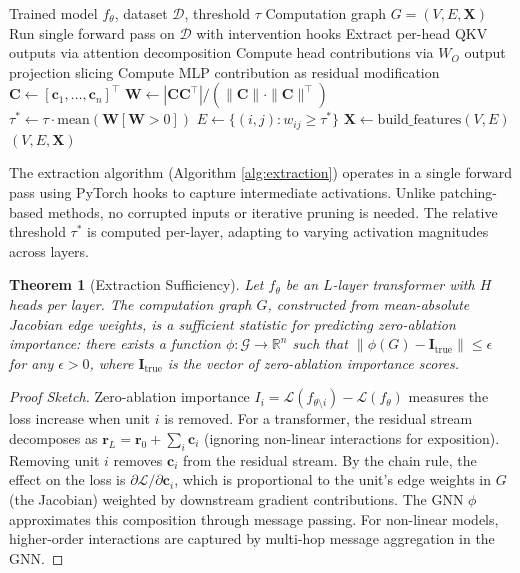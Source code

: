 \documentclass[11pt,a4paper]{article}
\newtheorem{theorem}{Theorem}[section]
\begin{document}
\begin{algorithm}[t]
\caption{GNOmE Circuit Extraction}\label{alg:extraction}
\begin{algorithmic}[1]
\Require Trained model $f_\theta$, dataset $\mathcal{D}$, threshold $\tau$
\Ensure Computation graph $G = (V, E, \mathbf{X})$
\State Run single forward pass on $\mathcal{D}$ with intervention hooks
    \State Extract per-head QKV outputs via attention decomposition
    \State Compute head contributions via $W_O$ output projection slicing
        \State Compute MLP contribution as residual modification
    \EndIf
\EndFor
\State $\mathbf{C} \leftarrow [\mathbf{c}_1, \ldots, \mathbf{c}_n]^\top$ 
\State $\mathbf{W} \leftarrow |\mathbf{C} \mathbf{C}^\top| / (\|\mathbf{C}\| \cdot \|\mathbf{C}\|^\top)$ 
\State $\tau^* \leftarrow \tau \cdot \text{mean}(\mathbf{W}[\mathbf{W} > 0])$ 
\State $E \leftarrow \{(i, j) : w_{ij} \geq \tau^*\}$ 
\State $\mathbf{X} \leftarrow \text{build\_features}(V, E)$ 
\State \Return $(V, E, \mathbf{X})$
\end{algorithmic}
\end{algorithm}

The extraction algorithm (Algorithm \ref{alg:extraction}) operates in a single forward pass using PyTorch hooks to capture intermediate activations. Unlike patching-based methods, no corrupted inputs or iterative pruning is needed. The relative threshold $\tau^*$ is computed per-layer, adapting to varying activation magnitudes across layers.

\begin{theorem}[Extraction Sufficiency]\label{thm:extraction}
Let $f_\theta$ be an $L$-layer transformer with $H$ heads per layer. The computation graph $G$, constructed from mean-absolute Jacobian edge weights, is a sufficient statistic for predicting zero-ablation importance: there exists a function $\phi: \mathcal{G} \to \mathbb{R}^n$ such that $\|\phi(G) - \mathbf{I}_{\text{true}}\| \leq \epsilon$ for any $\epsilon > 0$, where $\mathbf{I}_{\text{true}}$ is the vector of zero-ablation importance scores.
\end{theorem}

\begin{proof}[Proof Sketch]
Zero-ablation importance $I_i = \mathcal{L}(f_{\theta \setminus i}) - \mathcal{L}(f_\theta)$ measures the loss increase when unit $i$ is removed. For a transformer, the residual stream decomposes as $\mathbf{r}_L = \mathbf{r}_0 + \sum_i \mathbf{c}_i$ (ignoring non-linear interactions for exposition). Removing unit $i$ removes $\mathbf{c}_i$ from the residual stream. By the chain rule, the effect on the loss is $\partial \mathcal{L}/\partial \mathbf{c}_i$, which is proportional to the unit's edge weights in $G$ (the Jacobian) weighted by downstream gradient contributions. The GNN $\phi$ approximates this composition through message passing. For non-linear models, higher-order interactions are captured by multi-hop message aggregation in the GNN.
\end{proof}
\end{document}
